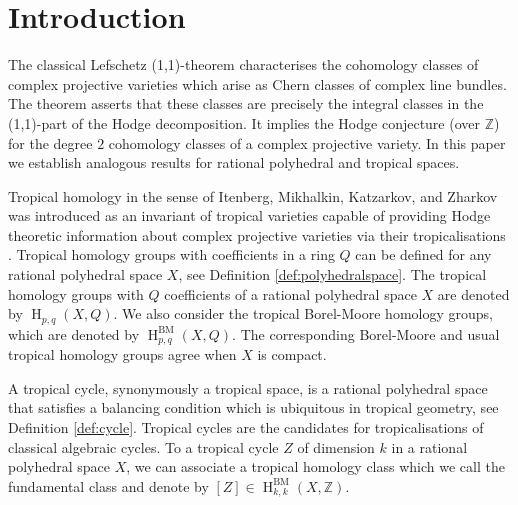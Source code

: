 \documentclass[11pt]{article}
\numberwithin{equation}{numsection}
\newcommand{\Z}{{\mathbb Z}}
\DeclareMathOperator{\BM}{BM}
\DeclareMathOperator{\HH}{H}
\begin{document}

\newpage

\setcounter{tocdepth}{1} \tableofcontents

\section{Introduction}








The classical Lefschetz (1,1)-theorem characterises the cohomology classes of complex projective varieties 
which arise  as Chern classes of complex line bundles. 
The theorem asserts that  these classes are precisely the  integral classes in the (1,1)-part of the Hodge decomposition.
It implies the Hodge conjecture (over $\Z$) 
for  the degree $2$ cohomology classes of a complex projective variety. 
In this paper we establish analogous results for rational polyhedral and tropical spaces. 


Tropical homology in the sense of Itenberg, Mikhalkin, Katzarkov, and Zharkov  was introduced as an invariant of tropical varieties 
capable of providing  Hodge theoretic information about complex projective varieties via their tropicalisations \cite{IKMZ}.
Tropical homology groups with coefficients in a ring $Q$ can be defined for any rational polyhedral space $X$, see Definition \ref{def:polyhedralspace}. 
The tropical homology  groups with $Q$ coefficients of a rational polyhedral space $X$ are denoted  by   $\HH_{p, q} (X , Q)$. 
We also consider the tropical Borel-Moore homology groups, which are denoted  by $\HH_{p, q}^{\BM}(X, Q)$. 
The corresponding Borel-Moore and usual tropical homology groups agree when $X$ is compact.

A tropical cycle, synonymously a tropical space,  is a rational polyhedral space that satisfies  a balancing condition which is ubiquitous in tropical geometry, see Definition \ref{def:cycle}. Tropical cycles are the candidates for tropicalisations of classical algebraic cycles.
To a tropical cycle  $Z$ of dimension $k$ in a rational polyhedral space $X$, we can associate a tropical homology class which we call the 
fundamental class and denote by $[Z] \in \HH_{k, k}^{\BM}(X, \Z)$.
\end{document}
